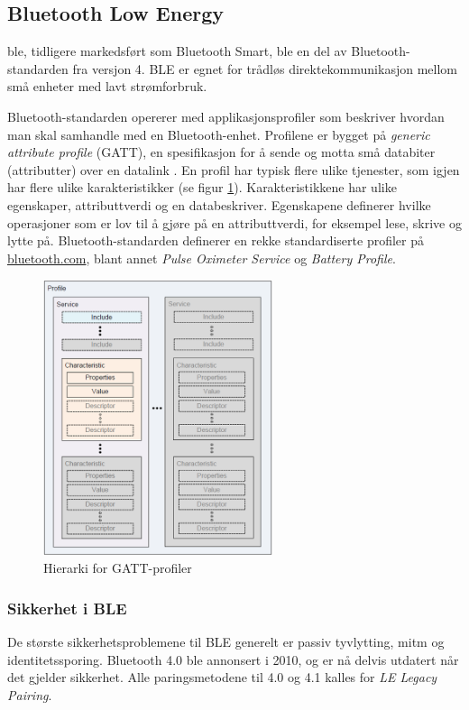 \subsection{Bluetooth Low Energy}
\gls{ble}, tidligere markedsført som Bluetooth Smart, ble en del av Bluetooth-standarden fra versjon 4. BLE er egnet
for trådløs direktekommunikasjon mellom små enheter med lavt strømforbruk.

Bluetooth-standarden opererer med applikasjonsprofiler som beskriver hvordan man skal samhandle med
en Bluetooth-enhet. Profilene er bygget på \textit{generic attribute profile} (GATT), en spesifikasjon for å sende og motta
små databiter (attributter) over en datalink \citep{bluetooth_gatt}.
En profil har typisk flere ulike tjenester, som igjen har flere ulike karakteristikker (se figur \ref{fig:gatt}).
Karakteristikkene har ulike egenskaper, attributtverdi og en databeskriver. Egenskapene definerer hvilke operasjoner som er lov
til å gjøre på en attributtverdi, for eksempel lese, skrive og lytte på. Bluetooth-standarden definerer en rekke standardiserte
profiler på \url{bluetooth.com}, blant annet \textit{Pulse Oximeter Service} og \textit{Battery Profile}.

\begin{figure}
\includegraphics[width=0.6\textwidth,center]{fig/gatt}
\caption{Hierarki for GATT-profiler \citep{bluetooth_gatt}}
\label{fig:gatt}
\end{figure}

\subsubsection{Sikkerhet i BLE}
De største sikkerhetsproblemene til BLE generelt er passiv tyvlytting, \gls{mitm} og identitetssporing.
Bluetooth 4.0 ble annonsert i 2010, og er nå delvis utdatert når det gjelder sikkerhet. Alle paringsmetodene
til 4.0 og 4.1 kalles for \textit{LE Legacy Pairing}. 

